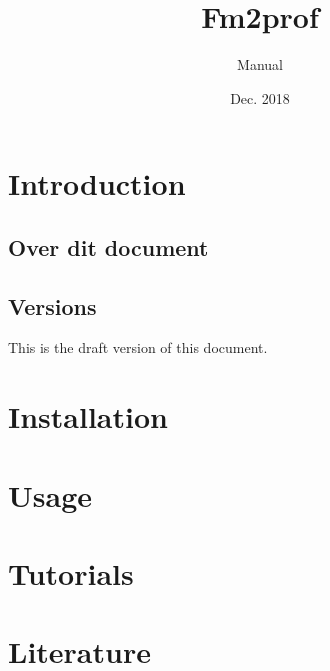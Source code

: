 \documentclass[signature]{deltares_manual}
\begin{document}
\pagestyle{empty}
\cleardoublepage
%
\newcommand{\ProgramName}{Fm2prof\xspace}

\title{\ProgramName}
\subtitle{Manual}
\classification{-}

\date{Dec. 2018}



\summary{}

\authori{}
\revieweri{}
\approvali{}



\deltarestitle


\chapter{Introduction} 
\label{chapterIntroduction}
\citep{Fm2prof_Manual2018}
\section{Over dit document} \label{sec:PurposeAndScope}

\section{Versions}
\label{sec:Versions}
This is the draft version of this document.

\chapter{Installation}
\label{sec:Installation}

\chapter{Usage}
\label{sec:usage}

\chapter{Tutorials}
\label{sec:Tutorials}


\chapter{Literature}  \label{chapterLiterature}




\pagestyle{empty}
\mbox{}

\end{document}

